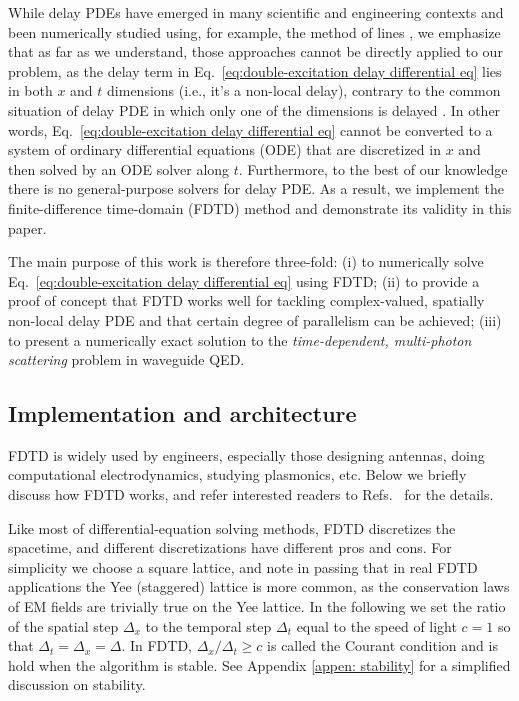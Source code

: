 \documentclass[12pt,letter,onecolumn,notitlepage]{article}
\begin{document}
While delay PDEs have emerged in many scientific and engineering contexts and been numerically studied using, for example, the method of lines \cite{Zubik_Kowal_Sch08}, we emphasize that as far as we understand, those approaches cannot be directly applied to our problem, as the delay term in Eq.~\eqref{eq:double-excitation delay differential eq} lies in both $x$ and $t$ dimensions (i.e., it's a non-local delay), contrary to the common situation of delay PDE in which only one of the dimensions is delayed \cite{Zubik_Kowal_Sch08}. In other words, Eq.~\eqref{eq:double-excitation delay differential eq} cannot be converted to a system of ordinary differential equations (ODE) that are discretized in $x$ and then solved by an ODE solver along $t$. Furthermore, to the best of our knowledge there is no general-purpose solvers for delay PDE. As a result, we implement the finite-difference time-domain (FDTD) method and demonstrate its validity in this paper.  

The main purpose of this work is therefore three-fold: (i) to numerically solve Eq.~\eqref{eq:double-excitation delay differential eq} using FDTD; (ii) to provide a proof of concept that FDTD works well for tackling complex-valued, spatially non-local delay PDE and that certain degree of parallelism can be achieved; (iii)  to present a numerically exact solution to the \textit{time-dependent, multi-photon scattering} problem in waveguide QED.


\subsection{Implementation and architecture}
FDTD is widely used by engineers, especially those designing antennas, doing computational electrodynamics, studying plasmonics, etc. 
Below we briefly discuss how FDTD works, and refer interested readers to Refs.~\cite{FDTDbook,FDTDnote} for the details.

Like most of differential-equation solving methods, FDTD discretizes the spacetime, and different discretizations have different pros and cons. For simplicity we choose a square lattice, and note in passing that in real FDTD applications the Yee (staggered) lattice is more common, as the conservation laws of EM fields are trivially true on the Yee lattice. In the following we set the ratio of the spatial step $\Delta_x$  to the temporal step $\Delta_t$  equal to the speed of light $c=1$ so that $\Delta_t=\Delta_x=\Delta$. In FDTD, $\Delta_x/\Delta_t\geq c$ is called the Courant condition and is hold when the algorithm is stable. See Appendix \ref{appen: stability} for a simplified discussion on stability.
\end{document}
